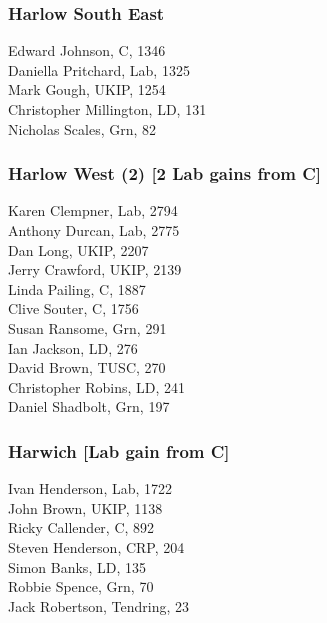 \documentclass[a4paper,openany,10pt]{book}
\begin{document}
\subsubsection*{Harlow South East}



Edward Johnson, C, 1346\\
Daniella Pritchard, Lab, 1325\\
Mark Gough, UKIP, 1254\\
Christopher Millington, LD, 131\\
Nicholas Scales, Grn, 82\\


\subsubsection*{Harlow West (2) \hspace*{\fill}\nolinebreak[1]%
\enspace\hspace*{\fill}
[2 Lab gains from C]}



Karen Clempner, Lab, 2794\\
Anthony Durcan, Lab, 2775\\
Dan Long, UKIP, 2207\\
Jerry Crawford, UKIP, 2139\\
Linda Pailing, C, 1887\\
Clive Souter, C, 1756\\
Susan Ransome, Grn, 291\\
Ian Jackson, LD, 276\\
David Brown, TUSC, 270\\
Christopher Robins, LD, 241\\
Daniel Shadbolt, Grn, 197\\


\subsubsection*{Harwich \hspace*{\fill}\nolinebreak[1]%
\enspace\hspace*{\fill}
[Lab gain from C]}



Ivan Henderson, Lab, 1722\\
John Brown, UKIP, 1138\\
Ricky Callender, C, 892\\
Steven Henderson, CRP, 204\\
Simon Banks, LD, 135\\
Robbie Spence, Grn, 70\\
Jack Robertson, Tendring, 23\\
\end{document}
